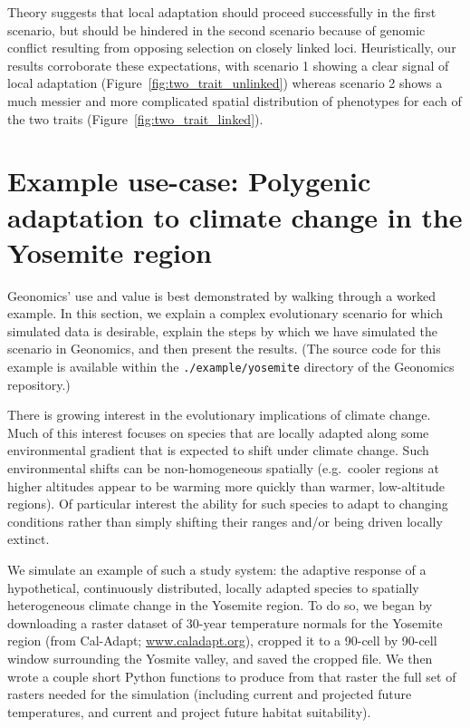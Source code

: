 ﻿\documentclass{article}
\begin{document}
Theory suggests that local adaptation should proceed successfully in the first scenario, but should be
hindered in the second scenario because of genomic conflict resulting from opposing selection
on closely linked loci.
Heuristically, our results corroborate these expectations, with scenario 1 showing a clear
signal of local adaptation (Figure~\ref{fig:two_trait_unlinked}) whereas scenario 2 shows a much messier and more complicated
spatial distribution of phenotypes for each of the two traits (Figure~\ref{fig:two_trait_linked}).


\section{Example use-case: Polygenic adaptation to climate change in the Yosemite region}
Geonomics' use and value is best demonstrated by walking through a worked example.
In this section, we explain a complex evolutionary scenario for which 
simulated data is desirable, explain the steps by which we have simulated the
scenario in Geonomics, and then present the results.
(The source code for this example is available within the
\texttt{./example/yosemite} directory of the Geonomics repository.)

There is growing interest in the evolutionary implications of climate change.
Much of this interest focuses on species that are locally adapted along some
environmental gradient that is expected to shift under climate change.
Such environmental shifts can be non-homogeneous spatially
(e.g.\ cooler regions at higher altitudes appear to be warming more
quickly than warmer, low-altitude regions).
Of particular interest the ability for such species to adapt
to changing conditions rather than simply shifting their ranges
and/or being driven locally extinct.

We simulate an example of such a study system: the adaptive
response of a hypothetical, continuously distributed, locally adapted species
to spatially heterogeneous climate change in the Yosemite region.
To do so, we began by downloading a raster dataset of 30-year
temperature normals for the Yosemite region (from Cal-Adapt; \url{www.caladapt.org}),
cropped it to a 90-cell by 90-cell window surrounding the Yosmite valley,
and saved the cropped file.
We then wrote a couple short Python functions to produce from that raster
the full set of rasters needed for the simulation
(including current and projected future temperatures,
and current and project future habitat suitability).
\end{document}
